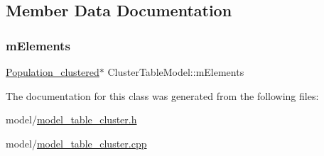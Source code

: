 \subsection{Member Data Documentation}
\mbox{\label{class_cluster_table_model_a8976691d944b9e33a830cd8f3b8f9c7c}} 
\subsubsection{\texorpdfstring{m\+Elements}{mElements}}
{\footnotesize\ttfamily \hyperlink{class_population__clustered}{Population\+\_\+clustered}$\ast$ Cluster\+Table\+Model\+::m\+Elements}



The documentation for this class was generated from the following files\+:\begin{DoxyCompactItemize}
\item 
model/\hyperlink{model__table__cluster_8h}{model\+\_\+table\+\_\+cluster.\+h}\item 
model/\hyperlink{model__table__cluster_8cpp}{model\+\_\+table\+\_\+cluster.\+cpp}\end{DoxyCompactItemize}
